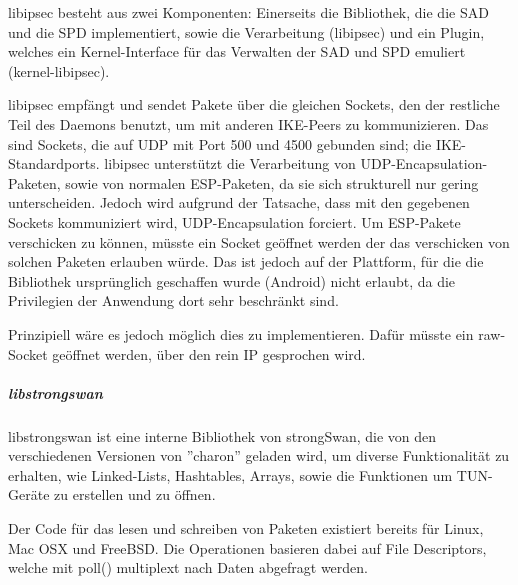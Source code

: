 libipsec besteht aus zwei Komponenten: Einerseits die Bibliothek, die die SAD und die SPD
implementiert, sowie die Verarbeitung (libipsec) und ein Plugin, welches ein Kernel-Interface
für das Verwalten der \ac{SAD} und \ac{SPD} emuliert (kernel-libipsec).

libipsec empfängt und sendet Pakete über die gleichen Sockets, den der restliche Teil
des Daemons benutzt, um mit anderen IKE-Peers zu kommunizieren. Das sind Sockets,
die auf UDP mit Port 500 und 4500 gebunden sind; die IKE-Standardports.
libipsec unterstützt die Verarbeitung von UDP-Encapsulation-Paketen, sowie von normalen ESP-Paketen,
da sie sich strukturell nur gering unterscheiden. Jedoch wird aufgrund der Tatsache,
dass mit den gegebenen Sockets kommuniziert wird, UDP-Encapsulation forciert.
Um ESP-Pakete verschicken zu können, müsste ein Socket geöffnet werden der das
verschicken von solchen Paketen erlauben würde. Das ist jedoch auf der Plattform,
für die die Bibliothek ursprünglich geschaffen wurde (Android) nicht erlaubt, da
die Privilegien der Anwendung dort sehr beschränkt sind.

Prinzipiell wäre es jedoch möglich dies zu implementieren. Dafür müsste ein
raw-Socket geöffnet werden, über den rein IP gesprochen wird.

\subparagraph{libstrongswan}
libstrongswan ist eine interne Bibliothek von strongSwan, die von den verschiedenen
Versionen von ''charon'' geladen wird, um diverse Funktionalität zu erhalten, wie
Linked-Lists, Hashtables, Arrays, sowie die Funktionen um TUN-Geräte zu erstellen und zu öffnen.

Der Code für das lesen und schreiben von Paketen existiert bereits für Linux, Mac OSX
und FreeBSD.
Die Operationen basieren dabei auf File Descriptors, welche mit poll() multiplext nach
Daten abgefragt werden.
